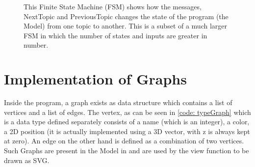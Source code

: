 \begin{figure}[h] %
\centering %
\caption{This Finite State Machine (FSM) 
        shows how the messages, NextTopic and PreviousTopic
        changes the state of the program (the Model) from
        one topic to another. This is a subset of a much larger
        FSM in which the number of states and inputs are greater
        in number.
        }
\label{fig:my_label}
\end{figure}
\section{Implementation of Graphs}
Inside the program, a graph exists as data structure which contains a list of
vertices and a list of edges. The vertex, as can be seen in \autoref{code:
typeGraph} which is a data type defined separately consists of a name (which is
an integer), a color, a 2D position (it is actually implemented using a 3D
vector, with z is always kept at zero).  An edge on the other hand is defined
as a combination of two vertices. Such Graphs are present in the Model in and
are used by the view function to be drawn as SVG.

